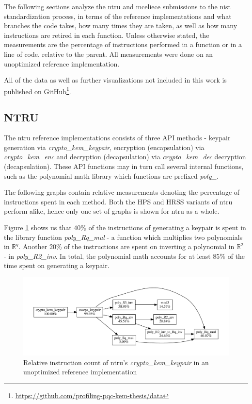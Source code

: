 The following sections analyze the \gls{ntru} and \gls{mceliece} submissions to the \gls{nist} standardization process, in terms of the reference implementations and what branches the code takes, how many times they are taken, as well as how many instructions are retired in each function. Unless otherwise stated, the measurements are the percentage of instructions performed in a function or in a line of code, relative to the parent. All measurements were done on an unoptimized reference implementation.

All of the data as well as further visualizations not included in this work is published on GitHub\footnote{\href{https://github.com/profiling-pqc-kem-thesis/data}{https://github.com/profiling-pqc-kem-thesis/data}}.

\subsection{NTRU}

The \gls{ntru} reference implementations consists of three API methods - keypair generation via \textit{crypto\_kem\_keypair}, encryption (encapsulation) via \textit{crypto\_kem\_enc} and decryption (decapsulation) via \textit{crypto\_kem\_dec}  decryption (decapsulation). These API functions may in turn call several internal functions, such as the polynomial math library which functions are prefixed \textit{poly\_}.

The following graphs contain relative measurements denoting the percentage of instructions spent in each method. Both the HPS and HRSS variants of \gls{ntru} perform alike, hence only one set of graphs is shown for \gls{ntru} as a whole.

Figure \ref{figure:result:hot-paths:ntru:crypto_kem_keypair} shows us that $40\%$ of the instructions of generating a keypair is spent in the library function \textit{poly\_Rq\_mul} - a function which multiplies two polynomials in $\mathbb{R}^q$. Another $20\%$ of the instructions are spent on inverting a polynomial in $\mathbb{R}^2$ - in \textit{poly\_R2\_inv}. In total, the polynomial math accounts for at least $85\%$ of the time spent on generating a keypair.

\begin{figure}[H]
    \centering
    \includegraphics[scale=0.5]{chapters/results/hot-paths/ntru/crypto_kem_keypair.pdf}
    \caption{Relative instruction count of \gls{ntru}'s \textit{crypto\_kem\_keypair} in an unoptimized reference implementation}
    \label{figure:result:hot-paths:ntru:crypto_kem_keypair}
\end{figure}

